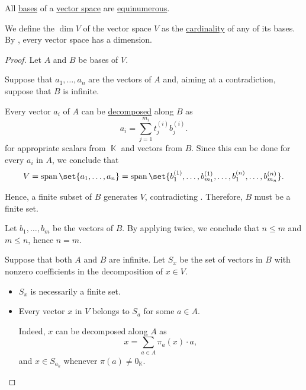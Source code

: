 \begin{proposition}\label{thm:vector_space_dimension}
  All \hyperref[def:hamel_basis]{bases} of a \hyperref[def:vector_space]{vector space} are \hyperref[def:equinumerosity]{equinumerous}.

  We define the  \( \dim V \) of the vector space \( V \) as the \hyperref[thm:cardinality_existence]{cardinality} of any of its bases. By , every vector space has a dimension.
\end{proposition}
\begin{proof}
  Let \( A \) and \( B \) be bases of \( V \).

   Suppose that \( a_1, \ldots, a_n \) are the vectors of \( A \) and, aiming at a contradiction, suppose that \( B \) is infinite.

  Every vector \( a_i \) of \( A \) can be \hyperref[def:basis_decomposition]{decomposed} along \( B \) as
  \begin{equation*}
    a_i = \sum_{j=1}^{m_i} t^{(i)}_j b^{(i)}_j.
  \end{equation*}
  for appropriate scalars from \( \BbbK \) and vectors from \( B \). Since this can be done for every \( a_i \) in \( A \), we conclude that
  \begin{equation*}
    V = \linspan\set{ a_1, \ldots, a_n } = \linspan\set{ b^{(1)}_1, \ldots, b^{(1)}_{m_1}, \ldots, b^{(n)}_1, \ldots, b^{(n)}_{m_n} }.
  \end{equation*}

  Hence, a finite subset of \( B \) generates \( V \), contradicting . Therefore, \( B \) must be a finite set.

  Let \( b_1, \ldots, b_m \) be the vectors of \( B \). By applying  twice, we conclude that \( n \leq m \) and \( m \leq n \), hence \( n = m \).

   Suppose that both \( A \) and \( B \) are infinite. Let \( S_x \) be the set of vectors in \( B \) with nonzero coefficients in the decomposition of \( x \in V \).
  \begin{itemize}
    \item \( S_x \) is necessarily a finite set.
    \item Every vector \( x \) in \( V \) belongs to \( S_a \) for some \( a \in A \).

    Indeed, \( x \) can be decomposed along \( A \) as
    \begin{equation*}
      x = \sum_{a \in A} \pi_a(x) \cdot a,
    \end{equation*}
    and \( x \in S_{a_k} \) whenever \( \pi(a) \neq 0_\BbbK \).


\end{itemize}
\end{proof}
